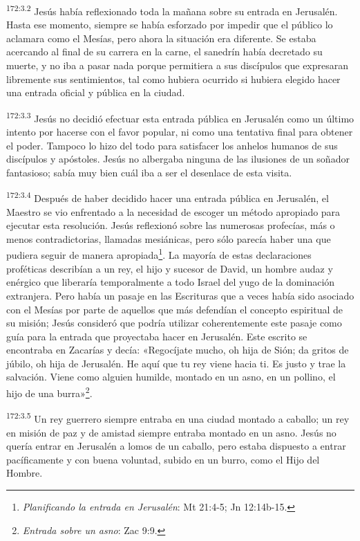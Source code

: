 \par 
\textsuperscript{172:3.2} Jesús había reflexionado toda la mañana sobre su entrada en Jerusalén. Hasta ese momento, siempre se había esforzado por impedir que el público lo aclamara como el Mesías, pero ahora la situación era diferente. Se estaba acercando al final de su carrera en la carne, el sanedrín había decretado su muerte, y no iba a pasar nada porque permitiera a sus discípulos que expresaran libremente sus sentimientos, tal como hubiera ocurrido si hubiera elegido hacer una entrada oficial y pública en la ciudad.

\par 
\textsuperscript{172:3.3} Jesús no decidió efectuar esta entrada pública en Jerusalén como un último intento por hacerse con el favor popular, ni como una tentativa final para obtener el poder. Tampoco lo hizo del todo para satisfacer los anhelos humanos de sus discípulos y apóstoles. Jesús no albergaba ninguna de las ilusiones de un soñador fantasioso; sabía muy bien cuál iba a ser el desenlace de esta visita.

\par 
\textsuperscript{172:3.4} Después de haber decidido hacer una entrada pública en Jerusalén, el Maestro se vio enfrentado a la necesidad de escoger un método apropiado para ejecutar esta resolución. Jesús reflexionó sobre las numerosas profecías, más o menos contradictorias, llamadas mesiánicas, pero sólo parecía haber una que pudiera seguir de manera apropiada\footnote{\textit{Planificando la entrada en Jerusalén}: Mt 21:4-5; Jn 12:14b-15.}. La mayoría de estas declaraciones proféticas describían a un rey, el hijo y sucesor de David, un hombre audaz y enérgico que liberaría temporalmente a todo Israel del yugo de la dominación extranjera. Pero había un pasaje en las Escrituras que a veces había sido asociado con el Mesías por parte de aquellos que más defendían el concepto espiritual de su misión; Jesús consideró que podría utilizar coherentemente este pasaje como guía para la entrada que proyectaba hacer en Jerusalén. Este escrito se encontraba en Zacarías y decía: «Regocíjate mucho, oh hija de Sión; da gritos de júbilo, oh hija de Jerusalén. He aquí que tu rey viene hacia ti. Es justo y trae la salvación. Viene como alguien humilde, montado en un asno, en un pollino, el hijo de una burra»\footnote{\textit{Entrada sobre un asno}: Zac 9:9.}.

\par 
\textsuperscript{172:3.5} Un rey guerrero siempre entraba en una ciudad montado a caballo; un rey en misión de paz y de amistad siempre entraba montado en un asno. Jesús no quería entrar en Jerusalén a lomos de un caballo, pero estaba dispuesto a entrar pacíficamente y con buena voluntad, subido en un burro, como el Hijo del Hombre.


